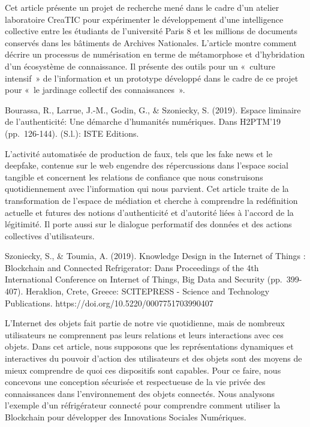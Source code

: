 \documentclass[
  letterpaper,
  DIV=11,
  numbers=noendperiod]{scrreprt}
\begin{document}
Cet article présente un projet de recherche mené dans le cadre d'un
atelier laboratoire CreaTIC pour expérimenter le développement d'une
intelligence collective entre les étudiants de l'université Paris 8 et
les millions de documents conservés dans les bâtiments de Archives
Nationales. L'article montre comment décrire un processus de
numérisation en terme de métamorphose et d'hybridation d'un écosystème
de connaissance. Il présente des outils pour un «~culture intensif~» de
l'information et un prototype développé dans le cadre de ce projet pour
«~le jardinage collectif des connaissances~».

Bourassa, R., Larrue, J.-M., Godin, G., \& Szoniecky, S. (2019). Espace
liminaire de l'authenticité: Une démarche d'humanités numériques. Dans
H2PTM'19 (pp.~126-144). (S.l.): ISTE Editions.

L'activité automatisée de production de faux, tels que les
\hspace{0pt}fake news\hspace{0pt} et le
\hspace{0pt}deepfake\hspace{0pt}, contenue sur le web engendre des
répercussions dans l'espace social tangible et concernent les relations
de confiance que nous construisons quotidiennement avec l'information
qui nous parvient. Cet article traite de la transformation de l'espace
de médiation et cherche à comprendre la redéfinition actuelle et futures
des notions d'authenticité et d'autorité liées à l'accord de la
légitimité. Il porte aussi sur le dialogue performatif des données et
des actions collectives d'utilisateurs.

Szoniecky, S., \& Toumia, A. (2019). Knowledge Design in the Internet of
Things : Blockchain and Connected Refrigerator: Dans Proceedings of the
4th International Conference on Internet of Things, Big Data and
Security (pp.~399-407). Heraklion, Crete, Greece: SCITEPRESS - Science
and Technology Publications. https://doi.org/10.5220/0007751703990407

L'Internet des objets fait partie de notre vie quotidienne, mais de
nombreux utilisateurs ne comprennent pas leurs relations et leurs
interactions avec ces objets. Dans cet article, nous supposons que les
représentations dynamiques et interactives du pouvoir d'action des
utilisateurs et des objets sont des moyens de mieux comprendre de quoi
ces dispositifs sont capables. Pour ce faire, nous concevons une
conception sécurisée et respectueuse de la vie privée des connaissances
dans l'environnement des objets connectés. Nous analysons l'exemple d'un
réfrigérateur connecté pour comprendre comment utiliser la Blockchain
pour développer des Innovations Sociales Numériques.
\end{document}

